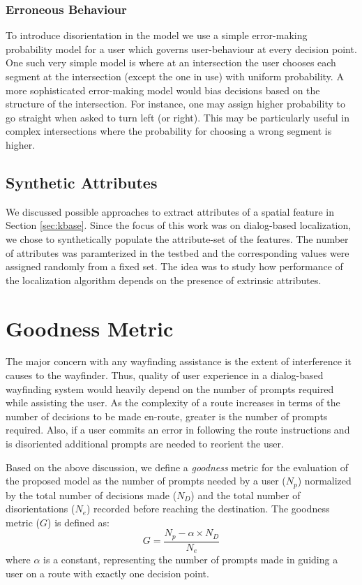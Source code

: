 \documentclass{iitkthesis}
\begin{document}
  \subsubsection*{Erroneous Behaviour}
To introduce disorientation in the model we use 
a simple error-making probability model for a user which governs user-behaviour at every decision point. One such very simple model is
where at an intersection the user chooses each segment at 
the intersection (except the one in use) with uniform 
probability. A more sophisticated error-making model would bias decisions 
based on the structure of the intersection. For instance, one may assign 
higher probability to go straight when asked to turn left (or right). 
This may be particularly useful in complex intersections where the 
probability for choosing a wrong segment is higher. 
  \subsection{Synthetic Attributes}
We discussed possible approaches to extract attributes of a spatial 
feature in Section \ref{sec:kbase}.  Since the focus of this 
work was on dialog-based localization, we chose to synthetically populate 
the attribute-set of the features. The number of attributes was 
paramterized in the testbed and the corresponding values were assigned 
randomly from a fixed set. The idea was to study how performance of the 
localization algorithm depends on the presence of extrinsic attributes. 
 \section{Goodness Metric}
The major concern with any wayfinding assistance is the extent of 
interference it causes to the wayfinder. Thus, quality of user experience 
in a dialog-based wayfinding system would heavily depend on the 
number of prompts required while assisting the user. As the complexity of 
a route increases in terms of the number of decisions to be made en-route, 
greater is the number of prompts required. Also, if a user 
commits an error in following the route instructions and is disoriented
additional prompts are needed to reorient the user. 

Based on the above discussion, we define a \textit{goodness} metric for the 
evaluation of the proposed model as the number of prompts 
needed by a user ($N_p$) normalized by the total number of decisions 
made ($N_D$) and the total number of disorientations ($N_e$) recorded 
before reaching the destination. The goodness metric ($G$) is defined 
as: 
\[\displaystyle G = \frac{N_p - \alpha \times N_D}{N_e}\]  
where $\alpha$ is a constant, representing the number of prompts made in 
guiding a user on a route with exactly one decision point.
\end{document}
